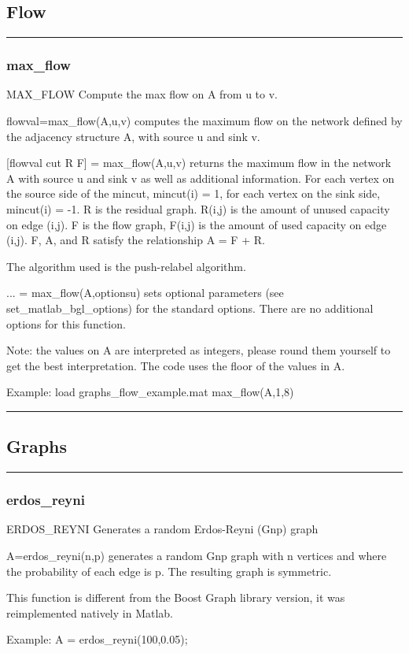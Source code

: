 \subsection*{Flow}
\vspace{1cm}
\hrule
\subsubsection*{max\_flow}
\begin{mcode}
  MAX_FLOW Compute the max flow on A from u to v.
 
  flowval=max_flow(A,u,v) computes the maximum flow on the network defined by
  the adjacency structure A, with source u and sink v.
 
  [flowval cut R F] = max_flow(A,u,v) returns the maximum flow in the 
  network A with source u and sink v as well as additional information.  
  For each vertex on the source side of the mincut, mincut(i) = 1, 
  for each vertex on the sink side, mincut(i) = -1.  
  R is the residual graph.  R(i,j) is the amount of unused capacity 
  on edge (i,j).  F is the flow graph, F(i,j) is the amount of used 
  capacity on edge (i,j).  F, A, and R satisfy the relationship A = F + R.
 
  The algorithm used is the push-relabel algorithm.
 
  ... = max_flow(A,optionsu) sets optional parameters (see 
  set_matlab_bgl_options) for the standard options.
    There are no additional options for this function.
 
  Note: the values on A are interpreted as integers, please round them
  yourself to get the best interpretation.  The code uses the floor of 
  the values in A.
 
  Example:
     load graphs\max_flow_example.mat
     max_flow(A,1,8)
\end{mcode}
\newpage
\hrule
\subsection*{Graphs}
\vspace{1cm}
\hrule
\subsubsection*{erdos\_reyni}
\begin{mcode}
  ERDOS_REYNI Generates a random Erdos-Reyni (Gnp) graph
 
  A=erdos_reyni(n,p) generates a random Gnp graph with n vertices and where
  the probability of each edge is p.  The resulting graph is symmetric.
 
  This function is different from the Boost Graph library version, it was
  reimplemented natively in Matlab.
 
  Example:
    A = erdos_reyni(100,0.05);
\end{mcode}
\newpage
